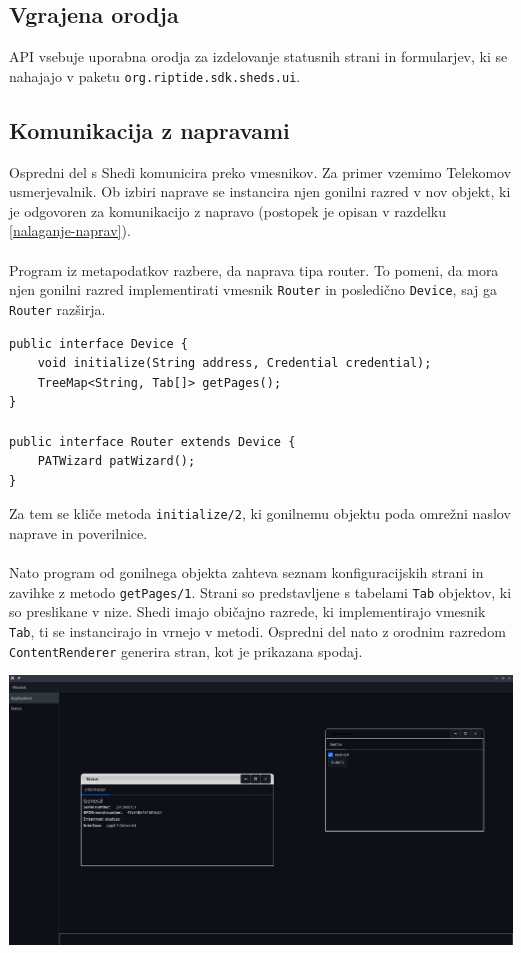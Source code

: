 \documentclass[12pt]{article}
\begin{document}
\subsection{Vgrajena orodja}
API vsebuje uporabna orodja za izdelovanje statusnih strani in
formularjev, ki se nahajajo v paketu \texttt{org.riptide.sdk.sheds.ui}.

\subsection{Komunikacija z napravami} \label{komunikacija-z-napravami}
Ospredni del s Shedi komunicira preko vmesnikov. Za primer vzemimo
Telekomov usmerjevalnik. Ob izbiri naprave se instancira njen gonilni
razred v nov objekt, ki je odgovoren za komunikacijo z napravo
(postopek je opisan v razdelku \ref{nalaganje-naprav}).
\\\\
Program iz metapodatkov razbere, da naprava tipa router. To pomeni,
da mora njen gonilni razred implementirati vmesnik \texttt{Router} in
posledično \texttt{Device}, saj ga \texttt{Router} razširja.
\newpage

\begin{lstlisting}[style=JavaStyle]
public interface Device {
	void initialize(String address, Credential credential);
	TreeMap<String, Tab[]> getPages();
}

public interface Router extends Device {
	PATWizard patWizard();
}
\end{lstlisting}
Za tem se kliče metoda \texttt{initialize/2}, ki gonilnemu objektu poda
omrežni naslov naprave in poverilnice.
\\\\
Nato program od gonilnega objekta zahteva seznam konfiguracijskih strani
in zavihke z metodo \texttt{getPages/1}. Strani so predstavljene s tabelami
\texttt{Tab} objektov, ki so preslikane v nize. Shedi imajo običajno razrede,
ki implementirajo vmesnik \texttt{Tab}, ti se instancirajo in vrnejo v
metodi. Ospredni del nato z orodnim razredom \texttt{ContentRenderer}
generira stran, kot je prikazana spodaj.

\begin{center}
	\includegraphics[scale=0.28]{slike/config-window.png}
\end{center}
\newpage
\end{document}
